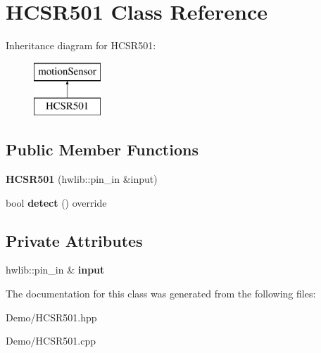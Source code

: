 \hypertarget{class_h_c_s_r501}{}\section{H\+C\+S\+R501 Class Reference}
\label{class_h_c_s_r501}
Inheritance diagram for H\+C\+S\+R501\+:\begin{figure}[H]
\begin{center}
\leavevmode
\includegraphics[height=2.000000cm]{class_h_c_s_r501}
\end{center}
\end{figure}
\subsection*{Public Member Functions}
\begin{DoxyCompactItemize}
\item 
\mbox{\label{class_h_c_s_r501_a589a13daf993e217138344db60086f36}} 
{\bfseries H\+C\+S\+R501} (hwlib\+::pin\+\_\+in \&input)
\item 
\mbox{\label{class_h_c_s_r501_a75456a573bf0066ee648f8f1a39d4966}} 
bool {\bfseries detect} () override
\end{DoxyCompactItemize}
\subsection*{Private Attributes}
\begin{DoxyCompactItemize}
\item 
\mbox{\label{class_h_c_s_r501_a00d41bcf68fa634e07ae68488d2b61ee}} 
hwlib\+::pin\+\_\+in \& {\bfseries input}
\end{DoxyCompactItemize}


The documentation for this class was generated from the following files\+:\begin{DoxyCompactItemize}
\item 
Demo/H\+C\+S\+R501.\+hpp\item 
Demo/H\+C\+S\+R501.\+cpp\end{DoxyCompactItemize}
